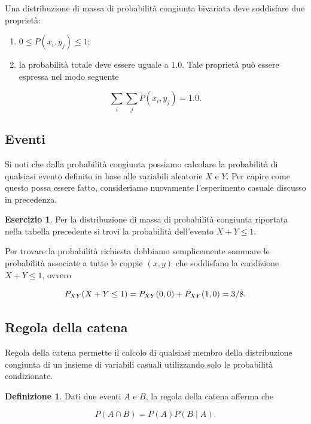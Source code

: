 \documentclass[
  11pt,
]{krantz}
\theoremstyle{definition}
\newtheorem{definition}{Definizione}[chapter]
\theoremstyle{definition}
\theoremstyle{definition}
\newtheorem{exercise}{Esercizio}[chapter]
\theoremstyle{definition}
\theoremstyle{remark}
\begin{document}
Una distribuzione di massa di probabilità congiunta bivariata deve soddisfare due proprietà:

\begin{enumerate}
\def\labelenumi{\arabic{enumi}.}
\item
  \(0 \leq P(x_i, y_j) \leq 1\);
\item
  la probabilità totale deve essere uguale a \(1.0\). Tale proprietà può essere espressa nel modo seguente
\end{enumerate}

\[
\sum_{i} \sum_{j} P(x_i, y_j) = 1.0.
\]

\hypertarget{eventi}{%
\subsection{Eventi}\label{eventi}}

Si noti che dalla probabilità congiunta possiamo calcolare la probabilità di qualsiasi evento definito in base alle variabili aleatorie \(X\) e \(Y\). Per capire come questo possa essere fatto, consideriamo nuovamente l'esperimento casuale discusso in precedenza.

\begin{exercise}
Per la distribuzione di massa di probabilità congiunta riportata nella tabella precedente si trovi la probabilità dell'evento \(X+Y \leq 1\).

Per trovare la probabilità richiesta dobbiamo semplicemente sommare le probabilità associate a tutte le coppie \((x,y)\) che soddisfano la condizione \(X+Y \leq 1\), ovvero

\begin{equation}
P_{XY}(X+Y \leq 1) = P_{XY}(0, 0) + P_{XY}(1, 0)= 3/8.\notag
\end{equation}
\end{exercise}

\hypertarget{regola-della-catena}{%
\subsection{Regola della catena}\label{regola-della-catena}}

Regola della catena permette il calcolo di qualsiasi membro della distribuzione congiunta di un insieme di variabili casuali utilizzando solo le probabilità condizionate.

\begin{definition}
Dati due eventi \(A\) e \(B\), la regola della catena afferma che

\[
P(A \cap B) = P(A)P(B \mid A).
\]
\end{definition}
\end{document}
